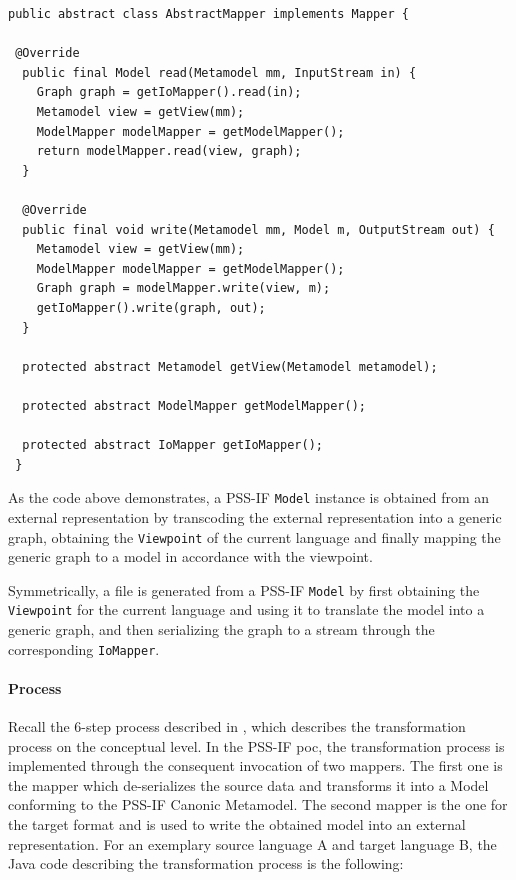 \begin{verbatim}
public abstract class AbstractMapper implements Mapper {

 @Override
  public final Model read(Metamodel mm, InputStream in) {
    Graph graph = getIoMapper().read(in);
    Metamodel view = getView(mm);
    ModelMapper modelMapper = getModelMapper();
    return modelMapper.read(view, graph);
  }

  @Override
  public final void write(Metamodel mm, Model m, OutputStream out) {
    Metamodel view = getView(mm);
    ModelMapper modelMapper = getModelMapper();
    Graph graph = modelMapper.write(view, m);
    getIoMapper().write(graph, out);
  }

  protected abstract Metamodel getView(Metamodel metamodel);

  protected abstract ModelMapper getModelMapper();

  protected abstract IoMapper getIoMapper();
 }
\end{verbatim}

As the code above demonstrates, a PSS-IF \texttt{Model} instance is obtained from an external representation by transcoding the external representation into a generic graph, obtaining the \texttt{Viewpoint} of the current language and finally mapping the generic graph to a model in accordance with the viewpoint.

Symmetrically, a file is generated from a PSS-IF \texttt{Model} by first obtaining the \texttt{Viewpoint} for the current language and using it to translate the model into a generic graph, and then serializing the graph to a stream through the corresponding \texttt{IoMapper}.

\paragraph{Process}

Recall the 6-step process described in , which describes the transformation process on the conceptual level. In the PSS-IF \gls{poc}, the transformation process is implemented through the consequent invocation of two mappers. The first one is the mapper which de-serializes the source data and transforms it into a Model conforming to the PSS-IF Canonic Metamodel. The second mapper is the one for the target format and is used to write the obtained model into an external representation. For an exemplary source language A and target language B, the Java code describing the transformation process is the following:

